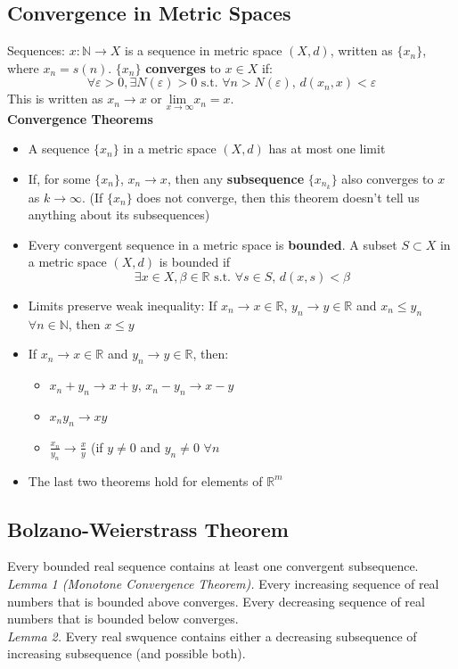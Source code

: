 \documentclass{article}
\newcommand{\N}{\mathbb{N}}
\newcommand{\R}{\mathbb{R}}
\newcommand{\lmt}{\underset{x\rightarrow\infty}{\text{lim }}}
\begin{document}
\subsection{Convergence in Metric Spaces}
Sequences: $x:\N\rightarrow X$ is a sequence in metric space $(X,d)$, written as $\{x_n\}$, where $x_n=s(n)$. $\{x_n\}$ \textbf{converges} to $x\in X$ if:
\[
	\forall\varepsilon>0,\exists N(\varepsilon)>0\text{ s.t. }\forall n>N(\varepsilon)\text{, }d(x_n,x)<\varepsilon
\]
This is written as $x_n\rightarrow x$ or $\lmt x_n=x$.
\medskip \\
\textbf{Convergence Theorems}
\begin{itemize}
	\item A sequence $\{x_n\}$ in a metric space $(X,d)$ has at most one limit
	
	\item If, for some $\{x_n\}$, $x_n\rightarrow x$, then any \textbf{subsequence} $\{x_{n_k}\}$ also converges to $x$ as $k\rightarrow\infty$. (If $\{x_n\}$ does not converge, then this theorem doesn't tell us anything about its subsequences)
	
	\item Every convergent sequence in a metric space is \textbf{bounded}. A subset $S\subset X$ in a metric space $(X,d)$ is bounded if
		\[
			\exists x\in X,\beta\in\R\text{ s.t. }\forall s\in S\text{, }d(x,s)<\beta
		\]
		
	\item Limits preserve weak inequality: If $x_n\rightarrow x\in\R$, $y_n\rightarrow y\in\R$ and $x_n\leq y_n$ $\forall n\in\N$, then $x\leq y$
	
	\item If $x_n\rightarrow x\in\R$ and $y_n\rightarrow y\in\R$, then:
		\begin{itemize}
			\item $x_n + y_n\rightarrow x+y$, $x_n-y_n\rightarrow x-y$
			\item $x_n y_n\rightarrow xy$
			\item $\frac{x_n}{y_n}\rightarrow\frac{x}{y}$ (if $y\neq 0$ and $y_n\neq 0$ $\forall n$
		\end{itemize}
		
	\item The last two theorems hold for elements of $\R^m$
\end{itemize}

\subsection{Bolzano-Weierstrass Theorem}
Every bounded real sequence contains at least one convergent subsequence.
\smallskip \\
\indent \textit{Lemma 1 (Monotone Convergence Theorem).} Every increasing sequence of real numbers that is bounded above converges. Every decreasing sequence of real numbers that is bounded below converges.
\smallskip \\
\indent \textit{Lemma 2.} Every real swquence contains either a decreasing subsequence of increasing subsequence (and possible both).
\end{document}
